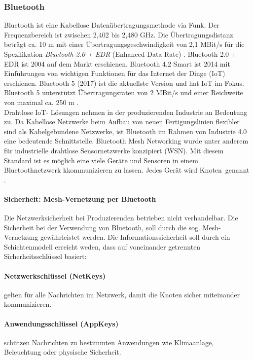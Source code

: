 \subsubsection{Bluetooth}

Bluetooth ist eine Kabellose Datenübertragungsmethode via Funk. Der Frequenzbereich ist zwischen 2,402 bis 2,480 GHz. Die Übertragungsdistanz beträgt ca. 10 m mit einer Übertragungsgeschwindigkeit von 2,1 MBit/s für die Spezifikation \textit{Bluetooth 2.0 + EDR} (Enhanced Data Rate) \cite[S. 481 f.]{Busch2015}.
Bluetooth 2.0 + EDR ist 2004 auf dem Markt erschienen. Bluetooth 4.2 Smart ist 2014 mit Einführungen von wichtigen Funktionen für das Internet der Dinge (IoT) erschienen. Bluetooth 5 (2017) ist die aktuellste Version und hat IoT im Fokus. Bluetooth 5 unterstützt Übertragungsraten von 2 MBit/s und einer Reichweite von maximal ca. 250 m \cite{bt5}.\\

Drahtlose IoT- Lösungen nehmen in der produzierenden Industrie an Bedeutung zu. Da Kabellose Netzwerke beim Aufbau von neuen Fertigungslinien flexibler sind als Kabelgebundene Netzwerke, ist Bluetooth im Rahmen von Industrie 4.0 eine bedeutende Schnittstelle. Bluetooth Mesh Networking wurde unter anderem für industrielle drahtlose Sensornetzwerke konzipiert (WSN). Mit diesem Standard ist es möglich eine viele Geräte und Sensoren in einem Bluetoothnetzwerk kkommunizieren zu lassen. Jedes Gerät wird \glqq Knoten\grqq \, genannt \cite{bti40}.

\paragraph{Sicherheit: Mesh-Vernetzung per Bluetooth \cite{bti40}}

Die Netzwerksicherheit bei Produzierenden betrieben nicht verhandelbar. Die Sicherheit bei der Verwendung von Bluetooth, soll durch die sog. Mesh-Vernetzung gewährleistet werden. Die Informationssicherheit soll durch ein Schichtenmodell erreicht weden, dass auf voneinander getrennten Sicherheitsschlüssel basiert:

\paragraph{Netzwerkschlüssel (NetKeys)} gelten für alle Nachrichten im Netzwerk, damit die Knoten sicher miteinander kommunizieren.

\paragraph{Anwendungsschlüssel (AppKeys)} schützen Nachrichten zu bestimmten Anwendungen wie Klimaanlage, Beleuchtung oder physische Sicherheit.

